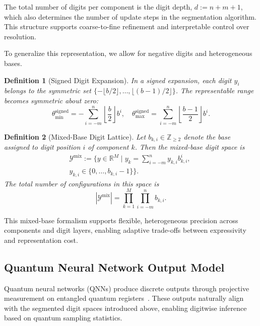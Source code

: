 \documentclass[aps,twocolumn,superscriptaddress,nofootinbib]{revtex4}
\newtheorem{definition}{Definition}
\begin{document}
\noindent The total number of digits per component is the digit depth, $d := n + m + 1$, which also determines the number of update steps in the segmentation algorithm. This structure supports coarse-to-fine refinement and interpretable control over resolution.

To generalize this representation, we allow for negative digits and heterogeneous bases.

\begin{definition}[Signed Digit Expansion]\label{def:signed_digits}
In a signed expansion, each digit $y_i$ belongs to the symmetric set $\{-\lfloor b/2 \rfloor, \ldots, \lfloor (b-1)/2 \rfloor\}$. The representable range becomes symmetric about zero:
\begin{equation}
\theta_{\min}^{\text{signed}} = -\sum_{i=-m}^{n} \left\lfloor \frac{b}{2} \right\rfloor b^i, \quad
\theta_{\max}^{\text{signed}} = \sum_{i=-m}^{n} \left\lfloor \frac{b-1}{2} \right\rfloor b^i.
\end{equation}
\end{definition}

\begin{definition}[Mixed-Base Digit Lattice]\label{Def:mix_lat_base}
Let $b_{k,i} \in \mathbb{Z}_{\geq 2}$ denote the base assigned to digit position $i$ of component $k$. Then the mixed-base digit space is
\begin{multline}
\mathcal{Y}^{\text{mix}} := \Big\{ y \in \mathbb{R}^M \;\Big|\; y_k = \sum_{i=-m}^{n} y_{k,i} b_{k,i}^i,\; \\
 y_{k,i} \in \{0, \ldots, b_{k,i} - 1\} \Big\}.
\end{multline}
The total number of configurations in this space is
\begin{equation}
|\mathcal{Y}^{\text{mix}}| = \prod_{k=1}^{M} \prod_{i=-m}^{n} b_{k,i}.
\end{equation}
\end{definition}
This mixed-base formalism supports flexible, heterogeneous precision across components and digit layers, enabling adaptive trade-offs between expressivity and representation cost.
\subsection{Quantum Neural Network Output Model}

Quantum neural networks (QNNs) produce discrete outputs through projective measurement on entangled quantum registers~\cite{benedetti2019parameterized,schuld2020circuit}. These outputs naturally align with the segmented digit spaces introduced above, enabling digitwise inference based on quantum sampling statistics.
\end{document}
